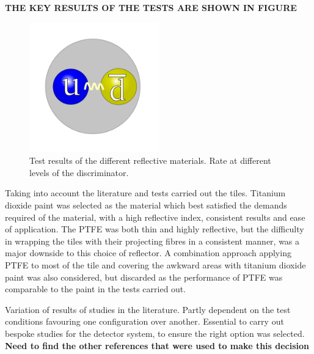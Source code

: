 \textbf{THE KEY RESULTS OF THE TESTS ARE SHOWN IN FIGURE}

\begin{figure}[!ht]
	\centering
	\includegraphics[width=0.5\textwidth]{ImgChap1/Meson2}
	\caption{Test results of the different reflective materials. Rate at different levels of the discriminator.}
	\label{ReflTestResults}
\end{figure}

Taking into account the literature and tests carried out the tiles. Titanium dioxide paint was selected as the material which best satisfied the demands required of the material, with a high reflective index, consistent results and ease of application. The PTFE was both thin and highly reflective, but the difficulty in wrapping the tiles with their projecting fibres in a consistent manner, was a major downside to this choice of reflector. A combination approach applying PTFE to most of the tile and covering the awkward areas with titanium dioxide paint was also considered, but discarded as the performance of PTFE was comparable to the paint in the tests carried out.

%
%
Variation of results of studies in the literature. Partly dependent on the test conditions favouring one configuration over another. Essential to carry out bespoke studies for the detector system, to ensure the right option was selected.
\cite{janecek2012reflectivity}
\cite{janecek2008optical}
\cite{weidner1981reflection}
\textbf{Need to find the other references that were used to make this decision}

